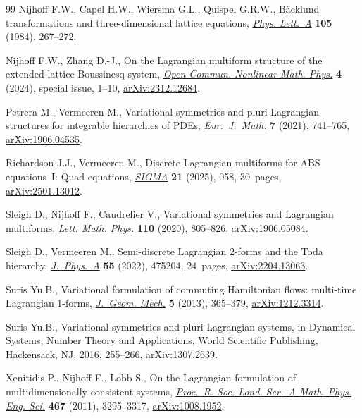 \begin{thebibliography}{99}
Nijhoff F.W., Capel H.W., Wiersma G.L., Quispel G.R.W., B\"acklund
 transformations and three-dimensional lattice equations,
 \href{https://doi.org/10.1016/0375-9601(84)90994-0}{\textit{Phys. Lett.~A}}
 \textbf{105} (1984), 267--272.

Nijhoff F.W., Zhang D.-J., On the {L}agrangian multiform structure of the
 extended lattice {B}oussinesq system,
 \href{https://doi.org/10.46298/ocnmp.12759}{\textit{Open Commun. Nonlinear
 Math. Phys.}} \textbf{4} (2024), special issue, 1--10,
 \href{http://arxiv.org/abs/2312.12684}{arXiv:2312.12684}.

Petrera M., Vermeeren M., Variational symmetries and pluri-{L}agrangian
 structures for integrable hierarchies of {PDE}s,
 \href{https://doi.org/10.1007/s40879-020-00436-7}{\textit{Eur.~J.~Math.}}
 \textbf{7} (2021), 741--765,
 \href{http://arxiv.org/abs/1906.04535}{arXiv:1906.04535}.

Richardson J.J., Vermeeren M., Discrete {L}agrangian multiforms for {ABS}
 equations~{I}: Quad equations,
 \href{https://doi.org/10.3842/SIGMA.2025.058}{\textit{SIGMA}} \textbf{21}
 (2025), 058, 30~pages,
 \href{http://arxiv.org/abs/2501.13012}{arXiv:2501.13012}.

Sleigh D., Nijhoff F., Caudrelier V., Variational symmetries and {L}agrangian
 multiforms, \href{https://doi.org/10.1007/s11005-019-01240-5}{\textit{Lett.
 Math. Phys.}} \textbf{110} (2020), 805--826,
 \href{http://arxiv.org/abs/1906.05084}{arXiv:1906.05084}.

Sleigh D., Vermeeren M., Semi-discrete {L}agrangian 2-forms and the {T}oda
 hierarchy,
 \href{https://doi.org/10.1088/1751-8121/aca451}{\textit{J.~Phys.~A}}
 \textbf{55} (2022), 475204, 24~pages,
 \href{http://arxiv.org/abs/2204.13063}{arXiv:2204.13063}.

Suris Yu.B., Variational formulation of commuting {H}amiltonian flows:
 multi-time {L}agrangian 1-forms,
 \href{https://doi.org/10.3934/jgm.2013.5.365}{\textit{J.~Geom. Mech.}}
 \textbf{5} (2013), 365--379,
 \href{http://arxiv.org/abs/1212.3314}{arXiv:1212.3314}.

Suris Yu.B., Variational symmetries and pluri-{L}agrangian systems, in Dynamical
 Systems, Number Theory and Applications,
 \href{https://doi.org/10.1142/9789814699877_0013}{World Scientific
 Publishing}, Hackensack, NJ, 2016, 255--266,
 \href{http://arxiv.org/abs/1307.2639}{arXiv:1307.2639}.

Xenitidis P., Nijhoff F., Lobb S., On the {L}agrangian formulation of
 multidimensionally consistent systems,
 \href{https://doi.org/10.1098/rspa.2011.0124}{\textit{Proc.~R. Soc. Lond.
 Ser.~A Math. Phys. Eng. Sci.}} \textbf{467} (2011), 3295--3317,
 \href{http://arxiv.org/abs/1008.1952}{arXiv:1008.1952}.

\end{thebibliography}
